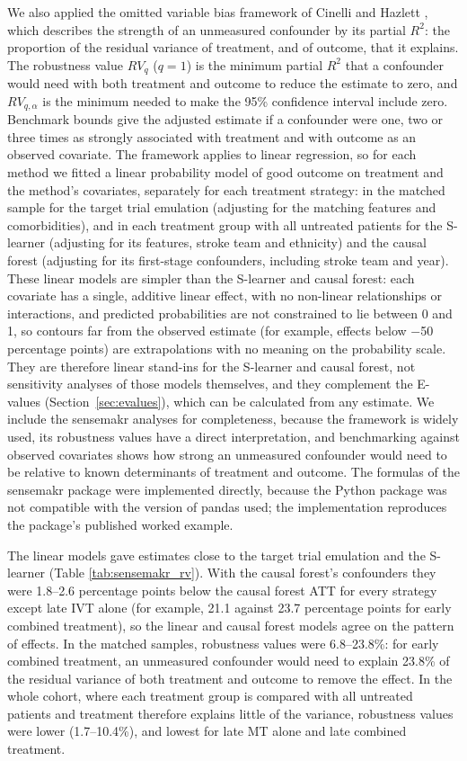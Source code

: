 We also applied the omitted variable bias framework of Cinelli and Hazlett , which describes the strength of an unmeasured confounder by its partial $R^2$: the proportion of the residual variance of treatment, and of outcome, that it explains. The robustness value $RV_q$ ($q=1$) is the minimum partial $R^2$ that a confounder would need with both treatment and outcome to reduce the estimate to zero, and $RV_{q,\alpha}$ is the minimum needed to make the 95\% confidence interval include zero. Benchmark bounds give the adjusted estimate if a confounder were one, two or three times as strongly associated with treatment and with outcome as an observed covariate. The framework applies to linear regression, so for each method we fitted a linear probability model of good outcome on treatment and the method's covariates, separately for each treatment strategy: in the matched sample for the target trial emulation (adjusting for the matching features and comorbidities), and in each treatment group with all untreated patients for the S-learner (adjusting for its features, stroke team and ethnicity) and the causal forest (adjusting for its first-stage confounders, including stroke team and year). These linear models are simpler than the S-learner and causal forest: each covariate has a single, additive linear effect, with no non-linear relationships or interactions, and predicted probabilities are not constrained to lie between 0 and 1, so contours far from the observed estimate (for example, effects below $-$50 percentage points) are extrapolations with no meaning on the probability scale. They are therefore linear stand-ins for the S-learner and causal forest, not sensitivity analyses of those models themselves, and they complement the E-values (Section~\ref{sec:evalues}), which can be calculated from any estimate. We include the sensemakr analyses for completeness, because the framework is widely used, its robustness values have a direct interpretation, and benchmarking against observed covariates shows how strong an unmeasured confounder would need to be relative to known determinants of treatment and outcome. The formulas of the sensemakr package were implemented directly, because the Python package was not compatible with the version of pandas used; the implementation reproduces the package's published worked example.

The linear models gave estimates close to the target trial emulation and the S-learner (Table \ref{tab:sensemakr_rv}). With the causal forest's confounders they were 1.8--2.6 percentage points below the causal forest ATT for every strategy except late IVT alone (for example, 21.1 against 23.7 percentage points for early combined treatment), so the linear and causal forest models agree on the pattern of effects. In the matched samples, robustness values were 6.8--23.8\%: for early combined treatment, an unmeasured confounder would need to explain 23.8\% of the residual variance of both treatment and outcome to remove the effect. In the whole cohort, where each treatment group is compared with all untreated patients and treatment therefore explains little of the variance, robustness values were lower (1.7--10.4\%), and lowest for late MT alone and late combined treatment.


